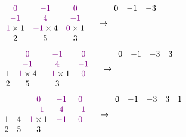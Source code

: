 \documentclass[11pt]{article}
\begin{document}
\[
\begin{array}{cccccccc}
    &&\textcolor{violet}{0}&\textcolor{violet}{-1}& \textcolor{violet}{0}& \\
    &&\textcolor{violet}{-1}&\textcolor{violet}{4}&\textcolor{violet}{-1} & \\
    &&\textcolor{violet}{1}\times 1&\textcolor{violet}{-1}\times 4&\textcolor{violet}{0} \times 1\\ 
    & & 2 & 5 & 3 & \\ 
\end{array}
\rightarrow
\begin{array}{ccccc}
    0 & -1 & -3 & &  \\
     &  &  & &  \\
     &  &  & &  \\
     &  &  & &  \\
\end{array}
\]
\[
\begin{array}{ccccccccc}
    &&&&\textcolor{violet}{0}&\textcolor{violet}{-1}& \textcolor{violet}{0}& \\
    &&&&\textcolor{violet}{-1}&\textcolor{violet}{4}&\textcolor{violet}{-1} & \\
    &&&1&\textcolor{violet}{1}\times 4&\textcolor{violet}{-1}\times 1&\textcolor{violet}{0} \\ 
    & & & 2 & 5 & 3 & \\ 
\end{array}
\rightarrow
\begin{array}{ccccc}
    0 & -1 & -3 &3 &  \\
     &  &  & &  \\
     &  &  & &  \\
     &  &  & &  \\
\end{array}
\]
\[
\begin{array}{cccccccccc}
    &&&&&\textcolor{violet}{0}&\textcolor{violet}{-1}& \textcolor{violet}{0}& \\
    &&&&&\textcolor{violet}{-1}&\textcolor{violet}{4}&\textcolor{violet}{-1} & \\
    &&&1&4&\textcolor{violet}{1}\times 1&\textcolor{violet}{-1}&\textcolor{violet}{0} \\ 
    & & & 2 & 5 & 3 & \\ 
\end{array}
\rightarrow
\begin{array}{ccccc}
    0 & -1 & -3 & 3&1\\
     &  &  & &  \\
     &  &  & &  \\
     &  &  & &  \\
\end{array}
\]
\end{document}
